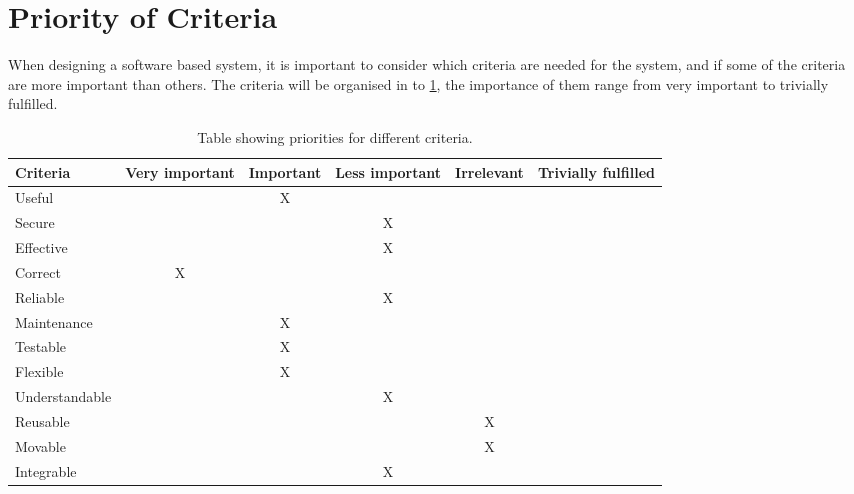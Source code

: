 \section{Priority of Criteria}

When designing a software based system, it is important to consider which criteria are needed for the system, and if some of the criteria are more important than others. The criteria will be organised in to \cref{CriteriaTable}, the importance of them range from very important to trivially fulfilled.

\begin{table}[h]
\begin{tabular}{|l|c|c|c|c|c|}\hline
Criteria        & Very important & Important & Less important & Irrelevant & Trivially fulfilled \\\hline
Useful          &                & X         &                &            &                     \\\hline
Secure          &                &           & X              &            &                     \\\hline
Effective       &                &           & X              &            &                     \\\hline
Correct         & X              &           &                &            &                     \\\hline
Reliable        &                &           & X              &            &                     \\\hline
Maintenance     &                & X         &                &            &                     \\\hline
Testable        &                & X         &                &            &                     \\\hline
Flexible        &                & X         &                &            &                     \\\hline
Understandable  &                &           & X              &            &                     \\\hline
Reusable        &                &           &                & X          &                     \\\hline
Movable         &                &           &                & X          &                     \\\hline
Integrable      &                &           & X              &            &                     \\\hline
\end{tabular}
\caption{Table showing priorities for different criteria.}
\label{CriteriaTable}
\end{table}

